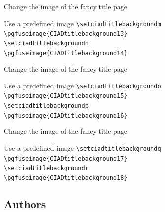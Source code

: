 \documentclass[english,sectioncirclenumberstyle]{ciadbeamer}
\begin{document}
\begin{frame}{Change the image of the fancy title page \insertcontinuationtext}
	\begin{block}{Use a predefined image}
		\texttt{{\textbackslash}setciadtitlebackgroundm}  \\
		\texttt{\textbackslash{}pgfuseimage\{CIADtitlebackground13\}} \\
		\texttt{{\textbackslash}setciadtitlebackgroundn}  \\
		\texttt{\textbackslash{}pgfuseimage\{CIADtitlebackground14\}}
	\end{block}
\end{frame}

\begin{frame}{Change the image of the fancy title page \insertcontinuationtext}
	\begin{block}{Use a predefined image}
		\texttt{{\textbackslash}setciadtitlebackgroundo}  \\
		\texttt{\textbackslash{}pgfuseimage\{CIADtitlebackground15\}} \\
		\texttt{{\textbackslash}setciadtitlebackgroundp}  \\
		\texttt{\textbackslash{}pgfuseimage\{CIADtitlebackground16\}}
	\end{block}
\end{frame}

\begin{frame}{Change the image of the fancy title page \insertcontinuationtext}
	\begin{block}{Use a predefined image}
		\texttt{{\textbackslash}setciadtitlebackgroundq}  \\
		\texttt{\textbackslash{}pgfuseimage\{CIADtitlebackground17\}} \\
		\texttt{{\textbackslash}setciadtitlebackgroundr}  \\
		\texttt{\textbackslash{}pgfuseimage\{CIADtitlebackground18\}}
	\end{block}
\end{frame}

\subsection{Authors}
\end{document}
